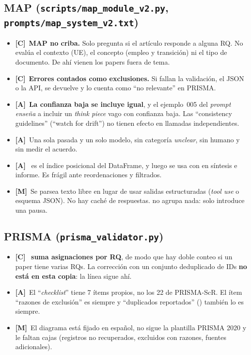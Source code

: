 \documentclass[11pt,a4paper]{article}
\newcommand{\sevC}{\textcolor{crit}{\textbf{[C]}}}
\newcommand{\sevA}{\textcolor{alto}{\textbf{[A]}}}
\newcommand{\sevM}{\textcolor{medio}{\textbf{[M]}}}
\begin{document}
\subsection{MAP (\texttt{scripts/map\_module\_v2.py}, \texttt{prompts/map\_system\_v2.txt})}
\begin{itemize}
  \item \sevC~\textbf{MAP no criba.} Solo pregunta si el artículo responde a alguna RQ. No evalúa el contexto (UE), el concepto (empleo y transición) ni el tipo de documento. De ahí vienen los papers fuera de tema.
  \item \sevC~\textbf{Errores contados como exclusiones.} Si fallan la validación, el JSON o la API, se devuelve  y  lo cuenta como ``no relevante'' en PRISMA.
  \item \sevA~\textbf{La confianza baja se incluye igual}, y el ejemplo~005 del \emph{prompt} \emph{enseña} a incluir un \emph{think piece} vago con confianza baja. Las ``consistency guidelines'' (``watch for drift'') no tienen efecto en llamadas independientes.
  \item \sevA~Una sola pasada y un solo modelo, sin categoría \emph{unclear}, sin humano y sin medir el acuerdo.
  \item \sevA~ es el índice posicional del DataFrame, y luego se usa con  en síntesis e informe. Es frágil ante reordenaciones y filtrados.
  \item \sevM~Se parsea texto libre en lugar de usar salidas estructuradas (\emph{tool use} o esquema JSON). No hay caché de respuestas.  no agrupa nada: solo introduce una pausa.
\end{itemize}

\subsection{PRISMA (\texttt{prisma\_validator.py})}
\begin{itemize}
  \item \sevC~\textbf{ suma asignaciones por RQ}, de modo que hay doble conteo si un paper tiene varias RQs. La corrección con un conjunto deduplicado de IDs \textbf{no está en esta copia}: la línea  sigue ahí.
  \item \sevA~El ``\emph{checklist}'' tiene 7 ítems propios, no los 22 de PRISMA-ScR. El ítem ``razones de exclusión'' es siempre  y ``duplicados reportados'' () también lo es siempre.
  \item \sevM~El diagrama está fijado en español, no sigue la plantilla PRISMA 2020 y le faltan cajas (registros no recuperados, excluidos con razones, fuentes adicionales).
\end{itemize}
\end{document}
